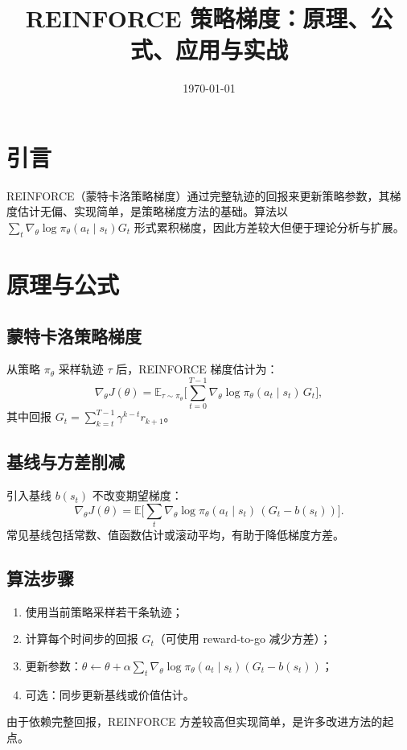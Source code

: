 \documentclass[UTF8,zihao=-4]{ctexart}
\title{REINFORCE 策略梯度：原理、公式、应用与实战}
\author{}
\date{\today}
\begin{document}
\maketitle

\section{引言}
REINFORCE（蒙特卡洛策略梯度）通过完整轨迹的回报来更新策略参数，其梯度估计无偏、实现简单，是策略梯度方法的基础。算法以 \(\sum_t \nabla_\theta \log \pi_\theta(a_t\mid s_t) G_t\) 形式累积梯度，因此方差较大但便于理论分析与扩展。

\section{原理与公式}
\subsection{蒙特卡洛策略梯度}
从策略 \(\pi_\theta\) 采样轨迹 \(\tau\) 后，REINFORCE 梯度估计为：
\begin{equation}
\nabla_\theta J(\theta) = \mathbb{E}_{\tau \sim \pi_\theta}\Big[ \sum_{t=0}^{T-1} \nabla_\theta \log \pi_\theta(a_t\mid s_t)\, G_t \Big],
\end{equation}
其中回报 \(G_t = \sum_{k=t}^{T-1} \gamma^{k-t} r_{k+1}\)。

\subsection{基线与方差削减}
引入基线 \(b(s_t)\) 不改变期望梯度：
\begin{equation}
\nabla_\theta J(\theta) = \mathbb{E}\Big[ \sum_t \nabla_\theta \log \pi_\theta(a_t\mid s_t)\, (G_t - b(s_t)) \Big].
\end{equation}
常见基线包括常数、值函数估计或滚动平均，有助于降低梯度方差。

\subsection{算法步骤}
\begin{enumerate}
  \item 使用当前策略采样若干条轨迹；
  \item 计算每个时间步的回报 \(G_t\)（可使用 reward-to-go 减少方差）；
  \item 更新参数：\(\theta \leftarrow \theta + \alpha \sum_t \nabla_\theta \log \pi_\theta(a_t\mid s_t)(G_t - b(s_t))\)；
  \item 可选：同步更新基线或价值估计。
\end{enumerate}
由于依赖完整回报，REINFORCE 方差较高但实现简单，是许多改进方法的起点。
\end{document}
